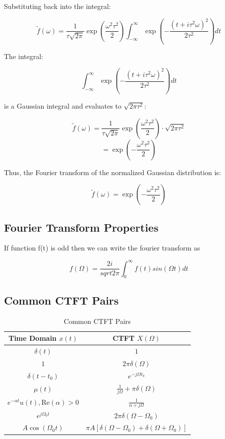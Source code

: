 \documentclass[12pt]{article}
\begin{document}
Substituting back into the integral:

\[ \tilde{f}(\omega) = \frac{1}{\tau \sqrt{2\pi}} \exp \left( \frac{\omega^2 \tau^2}{2} \right) \int_{-\infty}^{\infty} \exp \left( -\frac{(t + i\tau^2 \omega)^2}{2\tau^2} \right) dt \]

The integral:

\[ \int_{-\infty}^{\infty} \exp \left( -\frac{(t + i\tau^2 \omega)^2}{2\tau^2} \right) dt \]

is a Gaussian integral and evaluates to \( \sqrt{2\pi \tau^2} \):

\[ \tilde{f}(\omega) = \frac{1}{\tau \sqrt{2\pi}} \exp \left( \frac{\omega^2 \tau^2}{2} \right) \cdot \sqrt{2\pi \tau^2} \]
\[ = \exp \left( -\frac{\omega^2 \tau^2}{2} \right) \]

Thus, the Fourier transform of the normalized Gaussian distribution is:

\[ \tilde{f}(\omega) = \exp \left( -\frac{\omega^2 \tau^2}{2} \right) \]

\subsection{Fourier Transform Properties}

If function f(t) is odd then we can write the fourier transform as 

\[f(\Omega) = \frac{2i}{sqrt{2\pi}}\int_{0}^{\infty} f(t) sin(\Omega t)dt\]

\subsection{Common CTFT Pairs}

\begin{table}[h!]
    \centering
    \begin{tabular}{|c|c|}
        \hline
        \textbf{Time Domain} $x(t)$ & \textbf{CTFT} $X(\Omega)$ \\
        \hline
        $\delta(t)$ & $1$ \\
        \hline
        $1$ & $2\pi \delta(\Omega)$ \\
        \hline
        $\delta(t - t_0)$ & $e^{-j \Omega t_0}$ \\
        \hline
        $\mu(t)$ & $\frac{1}{j\Omega} + \pi \delta(\Omega)$ \\
        \hline
        $e^{-\alpha t} u(t), \text{Re}(\alpha) > 0$ & $\frac{1}{\alpha + j\Omega}$ \\
        \hline
        $e^{j\Omega_0 t}$ & $2\pi \delta(\Omega - \Omega_0)$ \\
        \hline
        $A \cos(\Omega_0 t)$ & $\pi A [\delta(\Omega - \Omega_0) + \delta(\Omega + \Omega_0)]$ \\
        \hline
    \end{tabular}
    \caption{Common CTFT Pairs}
    \label{tab:ctft_pairs}
\end{table}
\end{document}
